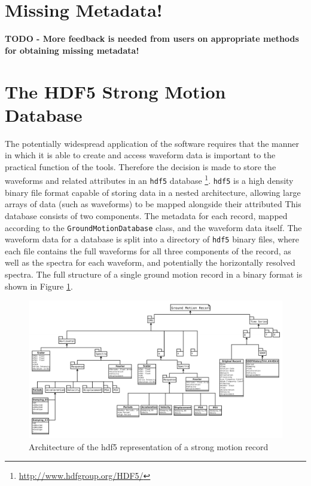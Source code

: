 \section{Missing Metadata!}
\label{sec:missing_metadata}


\textbf{TODO - More feedback is needed from users on appropriate methods for obtaining missing metadata!}

\section{The HDF5 Strong Motion Database}
\label{sec:hdf5}

The potentially widespread application of the software requires that the manner in which it is able to create and access waveform data is important to the practical function of the tools. Therefore the decision is made to store the waveforms and related attributes in an \verb=hdf5= database \footnote{\href{http://www.hdfgroup.org/HDF5/}{http://www.hdfgroup.org/HDF5/}}. \verb=hdf5= is a high density binary file format capable of storing data in a nested architecture, allowing large arrays of data (such as waveforms) to be mapped alongside their attributed This database consists of two components. The metadata for each record, mapped according to the \verb=GroundMotionDatabase= class, and the waveform data itself. The waveform data for a database is split into a directory of \verb=hdf5= 
binary files, where each file contains the full waveforms for all three components of the record, as well as the spectra for each waveform, and potentially the horizontally resolved spectra. The full structure of a single ground motion record in a binary format is shown in Figure \ref{fig:sm_hdf5_model}.

\begin{figure}
	\centering
		\includegraphics[width=\textwidth]{./figures/database/sm_database_architecture.pdf}
	\caption{Architecture of the hdf5 representation of a strong motion record}
	\label{fig:sm_hdf5_model}
\end{figure}

